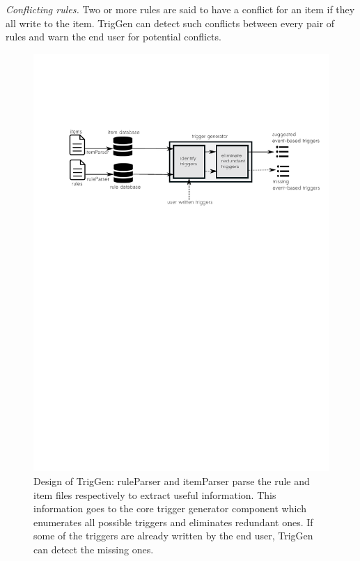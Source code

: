 \documentclass{sig-alternate-05-2015}
\begin{document}
\emph{Conflicting rules.} Two or more rules are said to have a conflict for an item if they all write to the item. TrigGen can detect such conflicts between every pair of rules and warn the end user for potential conflicts. 
\begin{figure}
\centering
\includegraphics [trim=2cm 18cm 0 5.5cm, scale=0.45]{images/design.pdf}
\caption{Design of TrigGen: ruleParser and itemParser parse the rule and item files respectively to extract useful information. This information goes to the core trigger generator component which enumerates all possible triggers and eliminates redundant ones. If some of the triggers are already written by the end user, TrigGen can detect the missing ones. }
\label{fig:design}
\end{figure} 
 
\end{document}
